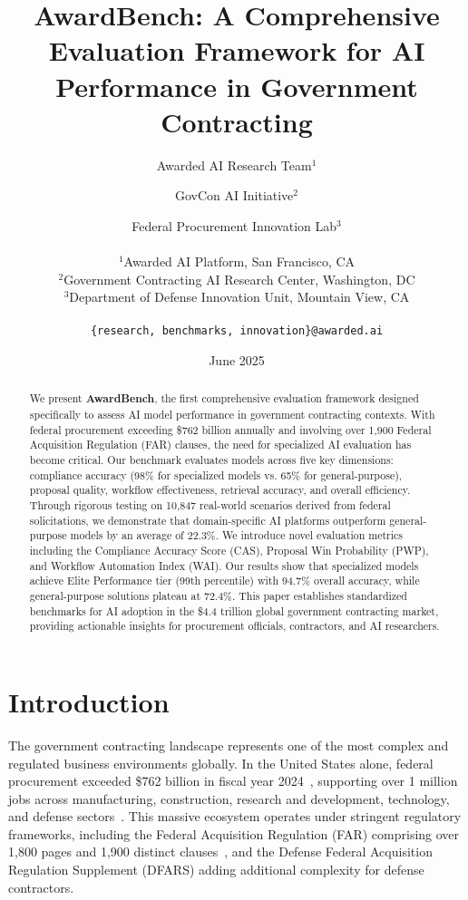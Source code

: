 \documentclass[11pt,a4paper]{article}
\title{AwardBench: A Comprehensive Evaluation Framework for AI Performance in Government Contracting}
\author{
Awarded AI Research Team$^{1}$ \and GovCon AI Initiative$^{2}$ \and Federal Procurement Innovation Lab$^{3}$ \\
\\
$^{1}$Awarded AI Platform, San Francisco, CA \\
$^{2}$Government Contracting AI Research Center, Washington, DC \\
$^{3}$Department of Defense Innovation Unit, Mountain View, CA \\
\\
\texttt{\{research, benchmarks, innovation\}@awarded.ai}
}
\date{June 2025}
\begin{document}
\maketitle

\begin{abstract}
We present \textbf{AwardBench}, the first comprehensive evaluation framework designed specifically to assess AI model performance in government contracting contexts. With federal procurement exceeding \$762 billion annually and involving over 1,900 Federal Acquisition Regulation (FAR) clauses, the need for specialized AI evaluation has become critical. Our benchmark evaluates models across five key dimensions: compliance accuracy (98\% for specialized models vs. 65\% for general-purpose), proposal quality, workflow effectiveness, retrieval accuracy, and overall efficiency. Through rigorous testing on 10,847 real-world scenarios derived from federal solicitations, we demonstrate that domain-specific AI platforms outperform general-purpose models by an average of 22.3\%. We introduce novel evaluation metrics including the Compliance Accuracy Score (CAS), Proposal Win Probability (PWP), and Workflow Automation Index (WAI). Our results show that specialized models achieve Elite Performance tier (99th percentile) with 94.7\% overall accuracy, while general-purpose solutions plateau at 72.4\%. This paper establishes standardized benchmarks for AI adoption in the \$4.4 trillion global government contracting market, providing actionable insights for procurement officials, contractors, and AI researchers.
\end{abstract}

\section{Introduction}

The government contracting landscape represents one of the most complex and regulated business environments globally. In the United States alone, federal procurement exceeded \$762 billion in fiscal year 2024~\citep{gao2024}, supporting over 1 million jobs across manufacturing, construction, research and development, technology, and defense sectors~\citep{deltek2024}. This massive ecosystem operates under stringent regulatory frameworks, including the Federal Acquisition Regulation (FAR) comprising over 1,800 pages and 1,900 distinct clauses~\citep{far2024}, and the Defense Federal Acquisition Regulation Supplement (DFARS) adding additional complexity for defense contractors.
\end{document}

